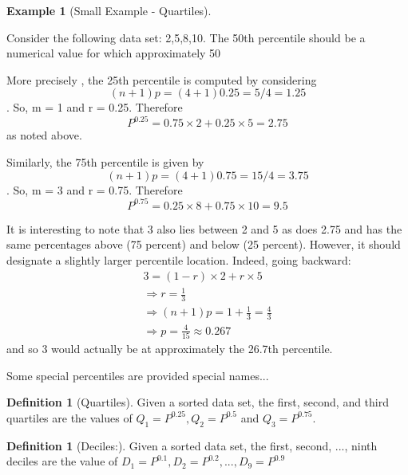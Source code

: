\documentclass[10pt,]{book}
\theoremstyle{plain}
\theoremstyle{definition}
\newtheorem{definition}[theorem]{Definition}
\theoremstyle{definition}
\newtheorem{example}[theorem]{Example}
\theoremstyle{definition}
\numberwithin{equation}{section}
\begin{document}
\begin{example}[Small Example - Quartiles]\label{example-3}

Consider the following data set: {2,5,8,10}. The 50th percentile should be a numerical value for which approximately 50%
\par
More precisely	, the 25th percentile is computed by considering 
	\begin{equation*}(n+1)p = (4+1)0.25 = 5/4 = 1.25\end{equation*}.  
	So, m = 1 and r = 0.25. Therefore 
	\begin{equation*}P^{0.25} = 0.75 \times 2 + 0.25 \times 5 = 2.75\end{equation*} 
	as noted above. 
\par

	Similarly, the 75th percentile is given by
	\begin{equation*}(n+1)p = (4+1)0.75 = 15/4 = 3.75\end{equation*}.  
	So, m = 3 and r = 0.75. Therefore 
	\begin{equation*}P^{0.75} = 0.25 \times 8 + 0.75 \times 10 = 9.5\end{equation*} 
	
	It is interesting to note that 3 also lies between 2 and 5 as does 2.75 and has the same percentages above (75 percent) and below (25 percent). However, it should designate a slightly larger percentile location. Indeed, going backward:
	\begin{gather*}
3 = (1-r) \times 2 + r \times 5\\
\Rightarrow r = \frac{1}{3}\\
\Rightarrow (n+1)p = 1 + \frac{1}{3} = \frac{4}{3}\\
\Rightarrow p = \frac{4}{15} \approx 0.267
\end{gather*}
	and so 3 would actually be at approximately the 26.7th percentile.
\end{example}
\par
Some special percentiles are provided special names...
\begin{definition}[{Quartiles}]\label{definition-4}
Given a sorted data set, the first, second, and third quartiles are the values of 
	\(Q_1 = P^{0.25}, Q_2 = P^{0.5}\) and \(Q_3 = P^{0.75}\).
\end{definition}
\begin{definition}[{Deciles:}]\label{definition-5}
Given a sorted data set, the first, second, ..., ninth deciles are the value of 
	\(D_1 = P^{0.1}, D_2 = P^{0.2}, ... , D_9 = P^{0.9}\)
\end{definition}
\par
\end{document}
